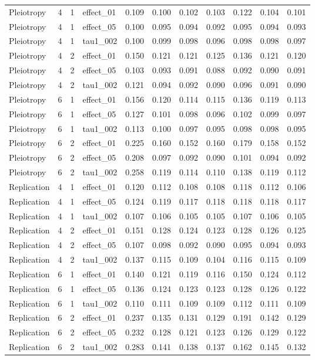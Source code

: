 {\begin{longtable}{lccl cccc ccc}
Pleiotropy & 4 & 1 & effect\_01 & 0.109 & 0.100 & 0.102 & 0.103 & 0.122 & 0.104 & 0.101\\
Pleiotropy & 4 & 1 & effect\_05 & 0.100 & 0.095 & 0.094 & 0.092 & 0.095 & 0.094 & 0.093\\
Pleiotropy & 4 & 1 & tau1\_002 & 0.100 & 0.099 & 0.098 & 0.096 & 0.098 & 0.098 & 0.097\\
Pleiotropy & 4 & 2 & effect\_01 & 0.150 & 0.121 & 0.121 & 0.125 & 0.136 & 0.121 & 0.120\\
Pleiotropy & 4 & 2 & effect\_05 & 0.103 & 0.093 & 0.091 & 0.088 & 0.092 & 0.090 & 0.091\\
Pleiotropy & 4 & 2 & tau1\_002 & 0.121 & 0.094 & 0.092 & 0.090 & 0.096 & 0.091 & 0.090\\
Pleiotropy & 6 & 1 & effect\_01 & 0.156 & 0.120 & 0.114 & 0.115 & 0.136 & 0.119 & 0.113\\
Pleiotropy & 6 & 1 & effect\_05 & 0.127 & 0.101 & 0.098 & 0.096 & 0.102 & 0.099 & 0.097\\
Pleiotropy & 6 & 1 & tau1\_002 & 0.113 & 0.100 & 0.097 & 0.095 & 0.098 & 0.098 & 0.095\\
Pleiotropy & 6 & 2 & effect\_01 & 0.225 & 0.160 & 0.152 & 0.160 & 0.179 & 0.158 & 0.152\\
Pleiotropy & 6 & 2 & effect\_05 & 0.208 & 0.097 & 0.092 & 0.090 & 0.101 & 0.094 & 0.092\\
Pleiotropy & 6 & 2 & tau1\_002 & 0.258 & 0.119 & 0.114 & 0.110 & 0.138 & 0.119 & 0.112\\
Replication & 4 & 1 & effect\_01 & 0.120 & 0.112 & 0.108 & 0.108 & 0.118 & 0.112 & 0.106\\
Replication & 4 & 1 & effect\_05 & 0.124 & 0.119 & 0.117 & 0.118 & 0.118 & 0.118 & 0.117\\
Replication & 4 & 1 & tau1\_002 & 0.107 & 0.106 & 0.105 & 0.105 & 0.107 & 0.106 & 0.105\\
Replication & 4 & 2 & effect\_01 & 0.151 & 0.128 & 0.124 & 0.123 & 0.128 & 0.126 & 0.125\\
Replication & 4 & 2 & effect\_05 & 0.107 & 0.098 & 0.092 & 0.090 & 0.095 & 0.094 & 0.093\\
Replication & 4 & 2 & tau1\_002 & 0.137 & 0.115 & 0.109 & 0.104 & 0.116 & 0.115 & 0.109\\
Replication & 6 & 1 & effect\_01 & 0.140 & 0.121 & 0.119 & 0.116 & 0.150 & 0.124 & 0.112\\
Replication & 6 & 1 & effect\_05 & 0.136 & 0.124 & 0.123 & 0.123 & 0.128 & 0.126 & 0.122\\
Replication & 6 & 1 & tau1\_002 & 0.110 & 0.111 & 0.109 & 0.109 & 0.112 & 0.111 & 0.109\\
Replication & 6 & 2 & effect\_01 & 0.237 & 0.135 & 0.131 & 0.129 & 0.191 & 0.142 & 0.129\\
Replication & 6 & 2 & effect\_05 & 0.232 & 0.128 & 0.121 & 0.123 & 0.126 & 0.129 & 0.122\\
Replication & 6 & 2 & tau1\_002 & 0.283 & 0.141 & 0.138 & 0.137 & 0.162 & 0.145 & 0.132\\
\end{longtable}}
